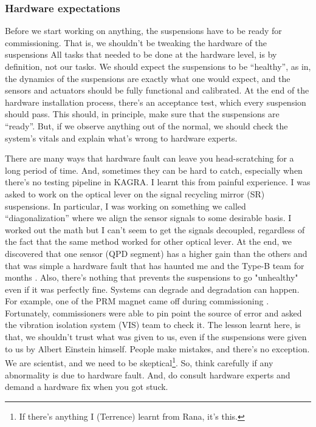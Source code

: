 \subsubsection{Hardware expectations}
Before we start working on anything, the suspensions have to be ready for commissioning.
That is, we shouldn't be tweaking the hardware of the suspensions
All tasks that needed to be done at the hardware level, is by definition, not our tasks.
We should expect the suspensions to be ``healthy'', as in, the dynamics of the suspensions are exactly what one would expect, and the sensors and actuators should be fully functional and calibrated.
At the end of the hardware installation process, there's an acceptance test, which every suspension should pass.
This should, in principle, make sure that the suspensions are ``ready''.
But, if we observe anything out of the normal, we should check the system's vitals and explain what's wrong to hardware experts.

There are many ways that hardware fault can leave you head-scratching for a long period of time.
And, sometimes they can be hard to catch, especially when there's no testing pipeline in KAGRA.
I learnt this from painful experience.
I was asked to work on the optical lever on the signal recycling mirror (SR) suspensions.
In particular, I was working on something we called ``diagonalization'' where we align the sensor signals to some desirable basis.
I worked out the math but I can't seem to get the signals decoupled, regardless of the fact that the same method worked for other optical lever.
At the end, we discovered that one sensor (QPD segment) has a higher gain than the others and that was simple a hardware fault that has haunted me and the Type-B team for months \cite{SR2_oplev_diagonalization, Comment_SR2_oplev}.
Also, there's nothing that prevents the suspensions to go "unhealthy" even if it was perfectly fine.
Systems can degrade and degradation can happen.
For example, one of the PRM magnet came off during commissioning \cite{PRM_magnet_came_off, MICH_got_locked}.
Fortunately, commissioners were able to pin point the source of error and asked the vibration isolation system (VIS) team to check it.
The lesson learnt here, is that, we shouldn't trust what was given to us, even if the suspensions were given to us by Albert Einstein himself.
People make mistakes, and there's no exception.
We are scientist, and we need to be skeptical\footnote{If there's anything I (Terrence) learnt from Rana, it's this.}.
So, think carefully if any abnormality is due to hardware fault.
And, do consult hardware experts and demand a hardware fix when you got stuck.

